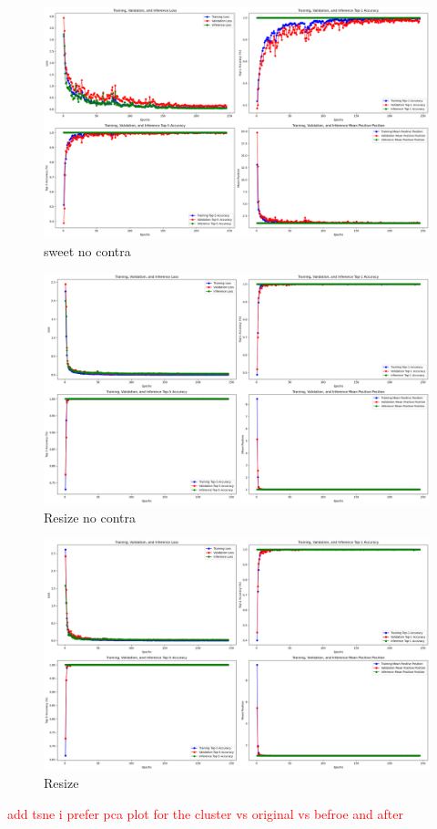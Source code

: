\begin{figure}[H]
  \centering
  \includegraphics[scale=0.3]{figures/sweet_no_contra.png} 
  \caption{sweet no contra}
  \label{fig:sweet_no_contra}
\end{figure}

\begin{figure}[H]
  \centering
  \includegraphics[scale=0.3]{figures/Resize_No_contra.png} 
  \caption{Resize no contra}
  \label{fig:Resize_No_contra_b64}
\end{figure}

\begin{figure}[H]
  \centering
  \includegraphics[scale=0.3]{figures/Resize.png} 
  \caption{Resize}
  \label{fig:Resize_b64}
\end{figure}


\textcolor{red}{add tsne i prefer pca plot for the cluster vs original vs befroe and after}